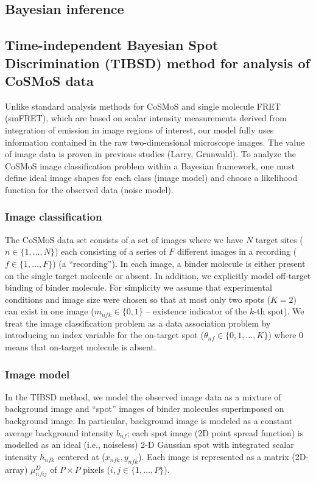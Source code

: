 \subsection{Bayesian inference}



\subsection{Time-independent Bayesian Spot Discrimination (TIBSD) method for analysis of CoSMoS data}

Unlike standard analysis methods for CoSMoS and single molecule FRET (smFRET), which are based on scalar intensity measurements derived from integration of emission in image regions of interest, our model fully uses information contained in the raw two-dimensional microscope images. The value of image data is proven in previous studies (Larry, Grunwald). To analyze the CoSMoS image classification problem within a Bayesian framework, one must define ideal image shapes for each class (image model) and choose a likelihood function for the observed data (noise model).

\subsubsection{Image classification}

The CoSMoS data set consists of a set of images where we have $N$ target sites ($n \in \{1,\dots,N\}$) each consisting of a series of $F$ different images in a recording ($f \in \{1,\dots,F\}$) (a “recording”). In each image, a binder molecule is either present on the single target molecule or absent. In addition, we explicitly model off-target binding of binder molecule. For simplicity  we assume that experimental conditions and image size were chosen so that at most only two spots ($K=2$) can exist in one image ($m_{nfk} \in \{ 0,1 \}$ -- existence indicator of the $k$-th spot). We treat the image classification problem as a data association problem by introducing an index variable for the on-target spot ($\theta_{nf} \in \{ 0,1,\dots,K \}$) where 0 means that on-target molecule is absent.

\subsubsection{Image model}

In the TIBSD method, we model the observed image data as a mixture of background image and “spot” images of binder molecules superimposed on background image. In particular, background image is modeled as a constant average background intensity $b_{nf}$; each spot image (2D point spread function) is modelled as an ideal (i.e., noiseless) 2-D Gaussian spot with integrated scalar intensity $h_{nfk}$ centered at ($x_{nfk}, y_{nfk}$). Each image is represented as a matrix (2D-array) $\mu^D_{nfij}$ of $P \times P$ pixels ($i,j \in \{1,\dots,P\}$). 

